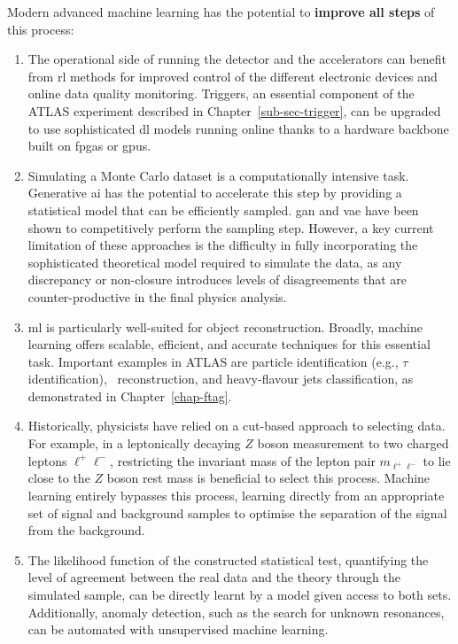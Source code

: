 Modern advanced machine learning has the potential to \textbf{improve all steps} of this process:
\begin{enumerate}
    \item The operational side of running the detector and the accelerators can benefit from \gls{rl} methods for improved control of the different electronic devices and online data quality monitoring. Triggers, an essential component of the ATLAS experiment described in Chapter~\ref{sub-sec-trigger}, can be upgraded to use sophisticated \gls{dl} models running online thanks to a hardware backbone built on \glspl{fpga} or \glspl{gpu}.
    \item Simulating a Monte Carlo dataset is a computationally intensive task. Generative \gls{ai} has the potential to accelerate this step by providing a statistical model that can be efficiently sampled. \gls{gan} and \gls{vae} have been shown to competitively perform the sampling step. However, a key current limitation of these approaches is the difficulty in fully incorporating the sophisticated theoretical model required to simulate the data, as any discrepancy or non-closure introduces levels of disagreements that are counter-productive in the final physics analysis.
    \item \gls{ml} is particularly well-suited for object reconstruction. Broadly, machine learning offers scalable, efficient, and accurate techniques for this essential task. Important examples in ATLAS are particle identification (e.g., $\tau$ identification), \etm\ reconstruction, and heavy-flavour jets classification, as demonstrated in Chapter~\ref{chap-ftag}.
    \item Historically, physicists have relied on a cut-based approach to selecting data. For example, in a leptonically decaying $Z$ boson measurement to two charged leptons $\ell^+\ell^-$, restricting the invariant mass of the lepton pair $m_{\ell^+\ell^-}$ to lie close to the $Z$ boson rest mass is beneficial to select this process. Machine learning entirely bypasses this process, learning directly from an appropriate set of signal and background samples to optimise the separation of the signal from the background. 
    \item The likelihood function of the constructed statistical test, quantifying the level of agreement between the real data and the theory through the simulated sample, can be directly learnt by a model given access to both sets. Additionally, anomaly detection, such as the search for unknown resonances, can be automated with unsupervised machine learning. 
\end{enumerate}

